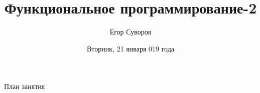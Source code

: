 \documentclass[utf8,xcolor=table]{beamer}
\title[ФП-2]{Функциональное программирование-2}
\author{Егор Суворов}
\institute[НИУ ВШЭ]{Курс <<Основы программирования>>}
\date[21.01.2020]{Вторник, 21 января 019 года}
\begin{document}
\begin{frame}
\titlepage
\end{frame}

\begin{frame}{План занятия}
	\tableofcontents
\end{frame}







\end{document}
